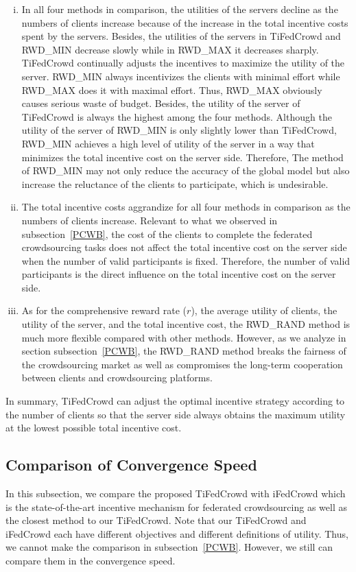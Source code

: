 \documentclass[final,1p,times]{elsarticle}
\begin{document}
\begin{enumerate}[(i)]
	\item In all four methods in comparison, the utilities of the servers decline as the numbers of clients increase because of the increase in the total incentive costs spent by the servers. Besides, the utilities of the servers in TiFedCrowd and RWD\_MIN decrease slowly while in RWD\_MAX it decreases sharply. TiFedCrowd continually adjusts the incentives to maximize the utility of the server. RWD\_MIN always incentivizes the clients with minimal effort while RWD\_MAX does it with maximal effort. Thus, RWD\_MAX obviously causes serious waste of budget. Besides, the utility of the server of TiFedCrowd is always the highest among the four methods. Although the utility of the server of RWD\_MIN is only slightly lower than TiFedCrowd, RWD\_MIN achieves a high level of utility of the server in a way that minimizes the total incentive cost on the server side. Therefore, The method of RWD\_MIN may not only reduce the accuracy of the global model but also increase the reluctance of the clients to participate, which is undesirable.
	\item The total incentive costs aggrandize for all four methods in comparison as the numbers of clients increase. Relevant to what we observed in subsection~\ref{PCWB}, the cost of the clients to complete the federated crowdsourcing tasks does not affect the total incentive cost on the server side when the number of valid participants is fixed. Therefore, the number of valid participants is the direct influence on the total incentive cost on the server side.
	\item As for the comprehensive reward rate ($r$), the average utility of clients, the utility of the server, and the total incentive cost, the RWD\_RAND method is much more flexible compared with other methods. However, as we analyze in section subsection~\ref{PCWB}, the RWD\_RAND method breaks the fairness of the crowdsourcing market as well as compromises the long-term cooperation between clients and crowdsourcing platforms.
\end{enumerate}

In summary, TiFedCrowd can adjust the optimal incentive strategy according to the number of clients so that the server side always obtains the maximum utility at the lowest possible total incentive cost. 

\subsection{Comparison of Convergence Speed} \label{CTCT}
In this subsection, we compare the proposed TiFedCrowd with iFedCrowd \citep{kang2022incentive} which is the state-of-the-art incentive mechanism for federated crowdsourcing as well as the closest method to our TiFedCrowd. Note that our TiFedCrowd and iFedCrowd each have different objectives and different definitions of utility. Thus, we cannot make the comparison in subsection~\ref{PCWB}. However, we still can compare them in the convergence speed. 
\end{document}
